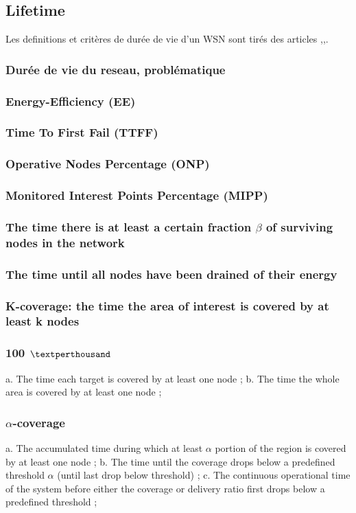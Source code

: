 \subsection{Lifetime}
Les definitions et critères de durée de vie d'un WSN sont tirés des articles \cite{Dietrich09},\cite{Baert06},\cite{Elleithy11}.


\subsubsection{Durée de vie du reseau, problématique}
\subsubsection{Energy-Efficiency (EE)}
\subsubsection{Time To First Fail (TTFF)}
\subsubsection{Operative Nodes Percentage (ONP)}
\subsubsection{Monitored Interest Points Percentage (MIPP)}
\subsubsection{The time there is at least a certain fraction $\beta$ of surviving nodes in the network }
\subsubsection{The time until all nodes have been drained of their energy }
\subsubsection{K-coverage: the time the area of interest is covered by at least k nodes }
\subsubsection{100 $\textperthousand$}
a. The time each target is covered by at least one node  ;
b. The time the whole area is covered by at least one node  ;

\subsubsection{$\alpha$-coverage}
a. The accumulated time during which at least $\alpha$ portion of the region is covered by
at least one node ;
b. The time until the coverage drops below a predefined threshold $\alpha$ (until last drop
below threshold)  ;
c. The continuous operational time of the system before either the coverage or
delivery ratio first drops below a predefined threshold ;

